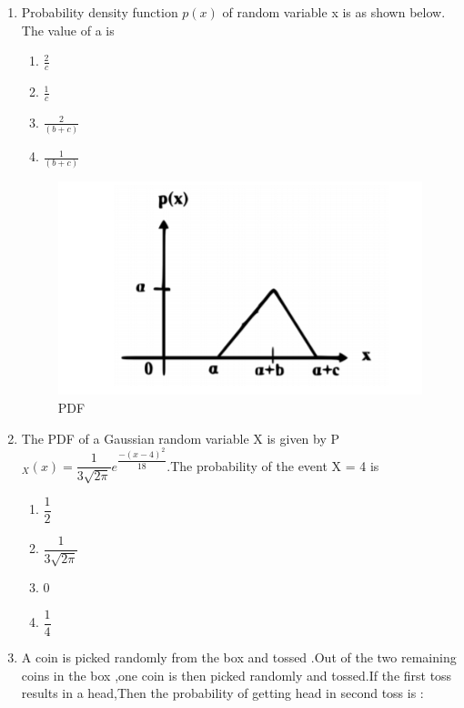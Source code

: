 \documentclass[journal,12pt,twocolumn]{IEEEtran}
\begin{document}
\begin{enumerate}
\item Probability density function $p(x)$ of random variable x is as shown below. The value of a is
\begin{enumerate}[label=\Alph*)]
    \item $\frac{2}{c}$
    \item $\frac{1}{c}$
    \item $\frac{2}{(b+c)}$
    \item $\frac{1}{(b+c)}$
\end{enumerate}
\begin{figure}[!ht]
\centering
\includegraphics[width=\columnwidth]{solutions/in/2006/2/figures/convolution.png}
\caption{PDF}
\label{in2006-2:fig:convolution}
\end{figure}
%
\solution

%
\item The PDF of a Gaussian random variable X is given by 
P$_{X}(x) = \dfrac{1}{3\sqrt{2\pi}}e^{\dfrac{-(x-4)^{2}}{18}}$.The probability of the event { X = 4} is\\
\begin{enumerate}
    \item  $\dfrac{1}{2}$\\
    \item  $\dfrac{1}{3\sqrt{2\pi}}$\\
    \item  0\\
    \item  $\dfrac{1}{4}$\\
\end{enumerate}
%
\solution

%
\item A coin is picked randomly from the box and tossed .Out of the two remaining coins in the box ,one coin is then picked randomly and tossed.If the first toss results in a head,Then the probability of getting head in second toss is :
\begin{enumerate}


\end{enumerate}
\end{enumerate}
\end{document}
